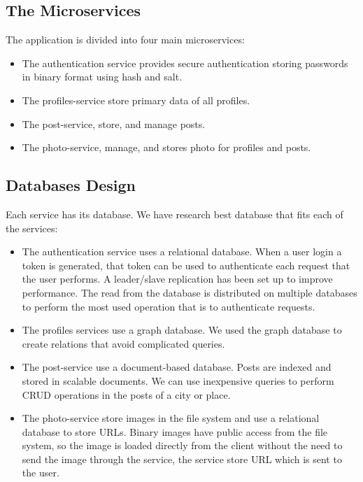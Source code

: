 \subsection{The Microservices}

The application is divided into four main microservices:
\begin{itemize}
	\item The authentication service provides secure authentication storing passwords in binary format using hash and salt.
 \item	The profiles-service store primary data of all profiles.
\item	The post-service, store, and manage posts.
\item	The photo-service, manage, and stores photo for profiles and posts. 
\end{itemize}




\subsection{Databases Design}

Each service has its database. We have research best database that fits each of the services:
\begin{itemize}
	\item The authentication service uses a relational database. When a user login a token is generated, that token can be used to authenticate each request that the user performs. A leader/slave replication has been set up to improve performance. The read from the database is distributed on multiple databases to perform the most used operation that is to authenticate requests.
	
	\item	The profiles services use a graph database. We used the graph database to create relations that avoid complicated queries.
	
	\item The post-service use a document-based database. Posts are indexed and stored in scalable documents. We can use inexpensive queries to perform CRUD operations in the posts of a city or place.
	
	\item	The photo-service store images in the file system and use a relational database to store URLs. Binary images have public access from the file system, so the image is loaded directly from the client without the need to send the image through the service, the service store URL which is sent to the user.

\end{itemize}

